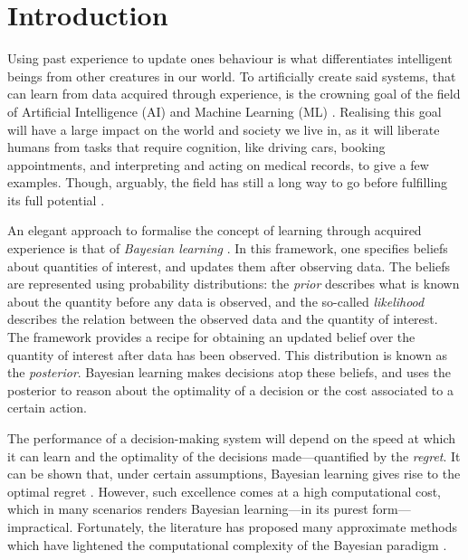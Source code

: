 \chapter{Introduction}  %

Using past experience to update ones behaviour is what differentiates intelligent beings from other creatures in our world. To artificially create said systems, that can learn from data acquired through experience, is the crowning goal of the field of Artificial Intelligence (AI) and Machine Learning (ML) \citep{turing}.
Realising this goal will have a large impact on the world and society we live in, as it will liberate humans from tasks that require cognition, like driving cars, booking appointments, and interpreting and acting on medical records, to give a few examples. Though, arguably, the field has still a long way to go before fulfilling its full potential \citep{grace2018will}.

An elegant approach to formalise the concept of learning through acquired experience is that of \emph{Bayesian learning} \citep{murphy}. In this framework, one specifies beliefs about quantities of interest, and updates them after observing data. The beliefs are represented using probability distributions: the \emph{prior} describes what is known about the quantity before any data is observed, and the so-called \emph{likelihood} describes the relation between the observed data and the quantity of interest. The framework provides a recipe for obtaining an updated belief over the quantity of interest after data has been observed. This distribution is known as the \emph{posterior}. Bayesian learning makes decisions atop these beliefs, and uses the posterior to reason about the optimality of a decision or the cost associated to a certain action.

The performance of a decision-making system will depend on the speed at which it can learn and the optimality of the decisions made---quantified by the \emph{regret}. It can be shown that, under certain assumptions, Bayesian learning gives rise to the optimal regret \citep{Lattimore}. However, such excellence comes at a high computational cost, which in many scenarios renders Bayesian learning---in its purest form---impractical. Fortunately, the literature has proposed many approximate methods which have lightened the computational complexity of the Bayesian paradigm \citep{Neal1993Probabilistic,jordan1999introduction,minka2001expectation}.

